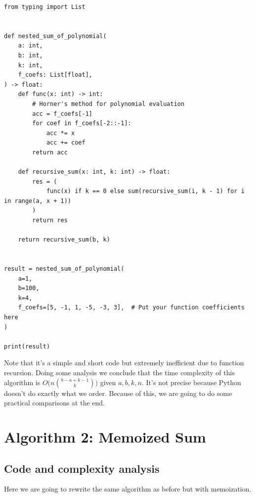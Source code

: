 \documentclass[12pt]{article}
\begin{document}
\begin{lstlisting}[style=Python]
from typing import List


def nested_sum_of_polynomial(
    a: int,
    b: int,
    k: int,
    f_coefs: List[float],
) -> float:
    def func(x: int) -> int:
        # Horner's method for polynomial evaluation
        acc = f_coefs[-1]
        for coef in f_coefs[-2::-1]:
            acc *= x
            acc += coef
        return acc

    def recursive_sum(x: int, k: int) -> float:
        res = (
            func(x) if k == 0 else sum(recursive_sum(i, k - 1) for i in range(a, x + 1))
        )
        return res

    return recursive_sum(b, k)


result = nested_sum_of_polynomial(
    a=1,
    b=100,
    k=4,
    f_coefs=[5, -1, 1, -5, -3, 3],  # Put your function coefficients here
)

print(result)

\end{lstlisting}

Note that it's a simple and short code but extremely inefficient due to function recursion. Doing some analysis we conclude that the time complexity of this algorithm is $O\Big(n \binom{b-a+k-1}{k}\Big)$ given $a, b, k, n$. It's not precise because Python doesn't do exactly what we order. Because of this, we are going to do some practical comparisons at the end.

\section{Algorithm 2: Memoized Sum}

\subsection{Code and complexity analysis}

Here we are going to rewrite the same algorithm as before but with memoization.
\end{document}
